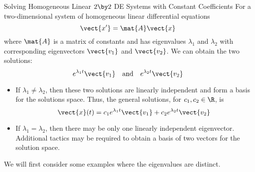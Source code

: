 \documentclass{beamer}
\begin{document}
\begin{frame}
\begin{block}{\small Solving Homogeneous Linear $2\by 2$ DE Systems with Constant Coefficients}
For a two-dimensional system of homogeneous linear differential equations 
\begin{equation*}
\vect{x^\prime}=\mat{A}\vect{x}
\end{equation*}
where $\mat{A}$ is a matrix of constants and has eigenvalues $\lambda_1$ and $\lambda_2$ with corresponding eigenvectors $\vect{v_1}$ and $\vect{v_2}$. We can obtain the two solutions:
\begin{equation*}
e^{\lambda_1 t}\vect{v_1}
\quad\text{and}\quad
e^{\lambda_2 t}\vect{v_2}
\end{equation*}

\vspace{-4mm}
\begin{itemize}
\item If $\lambda_1\neq \lambda_2$, then these two solutions are linearly independent and form a basis for the solutions space. Thus, the general solutions, for $c_1,c_2\in\R$, is
\begin{equation*}
\vect{x}(t)=c_1 e^{\lambda_1 t}\vect{v_1} + c_2 e^{\lambda_2 t}\vect{v_2}
\end{equation*}
\item If $\lambda_1 = \lambda_2$, then there may be only one linearly independent eigenvector. Additional tactics may be required to obtain a basis of two vectors for the solution space.
\end{itemize}
\end{block}\pause
\begin{block}{}
We will first consider some examples where the eigenvalues are distinct.
\end{block}
\end{frame}
\end{document}
